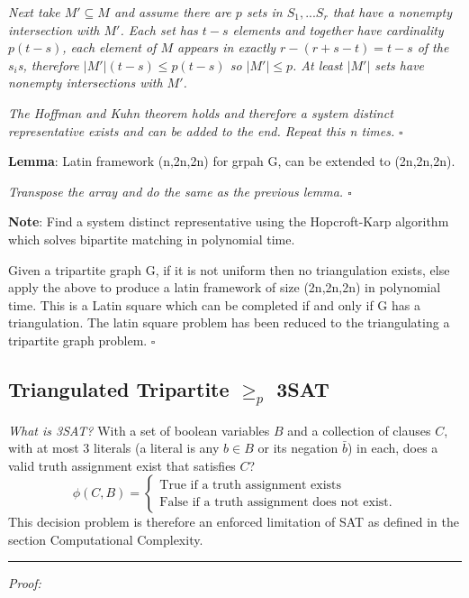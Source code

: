 \documentclass[a4paper,11pt]{report}
\newcounter{col}
\begin{document}
\textit{Next take $M'\subseteq M$ and assume there are $p$ sets in $S_1,...S_r$ that have a nonempty intersection with $M'$. Each set has $t-s$ elements and together have cardinality $p(t-s)$, each element of $M$ appears in exactly $r-(r+s-t)=t-s$ of the $s_i$s, therefore $|M'|(t-s)\leq p(t-s)$ so $|M'|\leq p$. At least $|M'|$ sets have nonempty intersections with $M'$.}

\textit{The Hoffman and Kuhn theorem holds and therefore a system distinct representative exists and can be added to the end. Repeat this n times.} $\square$

\textbf{Lemma}: Latin framework (n,2n,2n) for grpah G, can be extended to (2n,2n,2n).

\textit{Transpose the array and do the same as the previous lemma. $\square$}

\textbf{Note}: Find a system distinct representative using the Hopcroft-Karp \cite{hopcroft} algorithm which solves bipartite matching in polynomial time. 

Given a tripartite graph G, if it is not uniform then no triangulation exists, else apply the  above to produce a latin framework of size (2n,2n,2n) in polynomial time. This is a Latin square which can be completed if and only if G has a triangulation. The latin square problem has been reduced to the triangulating a tripartite graph problem. $\square$

\subsection{Triangulated Tripartite $\geq_p$ 3SAT}

\textit{What is 3SAT?} With a set of boolean variables $B$ and a collection of clauses $C$, with at most 3 literals (a literal is any $b \in B$ or its negation $\bar{b}$) in each, does a valid truth assignment exist that satisfies $C$?
		\begin{equation}
		        \phi (C,B) = \begin{cases}
		            \text{True if a truth assignment exists} \\
		            \text{False if a truth assignment does not exist}.
				\end{cases}
		\end{equation}
This decision problem is therefore an enforced limitation of SAT as defined in the section Computational Complexity.

\noindent\rule{4cm}{0.4pt}

\textit{Proof:}
\end{document}

